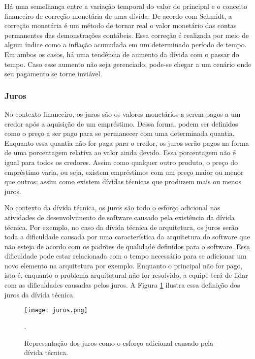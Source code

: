 Há uma semelhança entre a variação temporal do valor do principal e o conceito financeiro de correção monetária de uma dívida. De acordo com Schmidt\cite{santos2007teoria}, a correção monetária é um método de tornar real o valor monetário das contas permanentes das demonstrações contábeis. Essa correção é realizada por meio de algum índice como a inflação acumulada em um determinado período de tempo. Em ambos os casos, há uma tendência de aumento da dívida com o passar do tempo. Caso esse aumento não seja gerenciado, pode-se chegar a um cenário onde seu pagamento se torne inviável. 

\subsubsection{Juros} 

No contexto financeiro, os juros são os valores monetários a serem pagos a um credor após a aquisição de um empréstimo. Dessa forma, podem ser definidos como o preço a ser pago para se permanecer com uma determinada quantia. Enquanto essa quantia não for paga para o credor, os juros serão pagos na forma de uma porcentagem relativa ao valor ainda devido. Essa porcentagem não é igual para todos os credores. Assim como qualquer outro produto, o preço do empréstimo varia, ou seja, existem empréstimos com um preço maior ou menor que outros; assim como existem dívidas técnicas que produzem mais ou menos juros.

No contexto da dívida técnica, os juros são todo o esforço adicional nas atividades de desenvolvimento de software causado pela existência da dívida técnica. Por exemplo, no caso da dívida técnica de arquitetura, os juros serão toda a dificuldade causada por uma característica da arquitetura do software que não esteja de acordo com os padrões de qualidade definidos para o software. Essa dificuldade pode estar relacionada com o tempo necessário para se adicionar um novo elemento na arquitetura por exemplo. Enquanto o principal não for pago, isto é, enquanto o problema arquitetural não for resolvido, a equipe terá de lidar com as dificuldades causadas pelos juros. A Figura \ref{fig:juros} ilustra essa definição dos juros da dívida técnica. 

\begin{figure}[H]
  \centering
  \texttt{[image: juros.png]} 
  \caption{Representação dos juros como o esforço adicional causado pela dívida técnica. }.
  \label{fig:juros} 
\end{figure}



